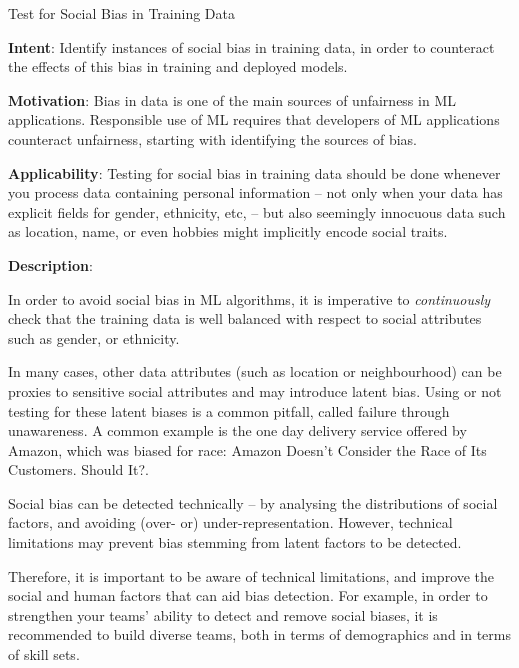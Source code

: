   
  \begin{frame}[plain]{ Test for Social Bias in Training Data
 }

  \textbf{Intent}: Identify instances of social bias in training data, in order to counteract the effects of this bias in training and deployed models.
 

  \textbf{Motivation}: Bias in data is one of the main sources of unfairness in ML applications. Responsible use of ML requires that developers of ML applications counteract unfairness, starting with identifying the sources of bias. 
 

  \textbf{Applicability}: Testing for social bias in training data should be done whenever you process data containing personal information -- not only when your data has explicit fields for gender, ethnicity, etc, -- but also seemingly innocuous data such as location, name, or even hobbies might implicitly encode social traits.  
 

  \textbf{Description}: 

In order to avoid social bias in ML algorithms, it is imperative to \emph{continuously} check that the training data is well balanced with respect to social attributes such as gender, or ethnicity.


In many cases, other data attributes (such as location or neighbourhood) can be proxies to sensitive social attributes and may introduce latent bias.
Using or not testing for these latent biases is a common pitfall, called failure through unawareness. A common example is the one day delivery service offered by Amazon, which was biased for race: Amazon Doesn’t Consider the Race of Its Customers. Should It?.


Social bias can be detected technically -- by analysing the distributions of social factors, and avoiding (over- or) under-representation.
However, technical limitations may prevent bias stemming from latent factors to be detected.


Therefore, it is important to be aware of technical limitations, and improve the social and human factors that can aid bias detection.
For example, in order to strengthen your teams' ability to detect and remove social biases, it is recommended to build diverse teams, both in terms of demographics and in terms of skill sets.


 


  \end{frame}

